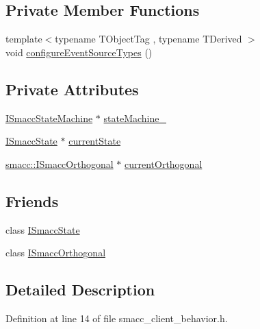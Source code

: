 \subsection*{Private Member Functions}
\begin{DoxyCompactItemize}
\item 
{\footnotesize template$<$typename T\+Object\+Tag , typename T\+Derived $>$ }\\void \hyperlink{classsmacc_1_1SmaccClientBehavior_a532a84b947599545a9955949c3b76648}{configure\+Event\+Source\+Types} ()
\end{DoxyCompactItemize}
\subsection*{Private Attributes}
\begin{DoxyCompactItemize}
\item 
\hyperlink{classsmacc_1_1ISmaccStateMachine}{I\+Smacc\+State\+Machine} $\ast$ \hyperlink{classsmacc_1_1SmaccClientBehavior_a7950b5684d6de0a8e8959c0936ce9a19}{state\+Machine\+\_\+}
\item 
\hyperlink{classsmacc_1_1ISmaccState}{I\+Smacc\+State} $\ast$ \hyperlink{classsmacc_1_1SmaccClientBehavior_af76fc9b877542ed5caf033f820c107d0}{current\+State}
\item 
\hyperlink{classsmacc_1_1ISmaccOrthogonal}{smacc\+::\+I\+Smacc\+Orthogonal} $\ast$ \hyperlink{classsmacc_1_1SmaccClientBehavior_a37e6a2fe61c3a72ed2f3e4180f552089}{current\+Orthogonal}
\end{DoxyCompactItemize}
\subsection*{Friends}
\begin{DoxyCompactItemize}
\item 
class \hyperlink{classsmacc_1_1SmaccClientBehavior_ab907e4cdbf326246355f56640780162e}{I\+Smacc\+State}
\item 
class \hyperlink{classsmacc_1_1SmaccClientBehavior_a7205cc84a71fea903124d54d01e99a68}{I\+Smacc\+Orthogonal}
\end{DoxyCompactItemize}


\subsection{Detailed Description}


Definition at line 14 of file smacc\+\_\+client\+\_\+behavior.\+h.



